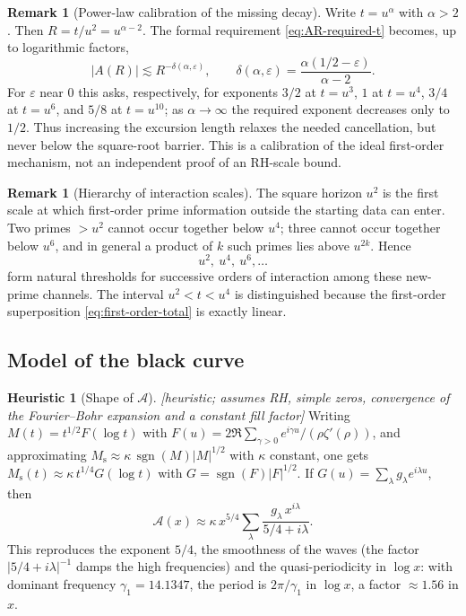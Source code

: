 \documentclass[11pt,reqno]{amsart}
\theoremstyle{plain}
\theoremstyle{definition}
\newtheorem{remark}[theorem]{Remark}
\newtheorem{heuristic}[theorem]{Heuristic}
\DeclareMathOperator{\sgn}{sgn}
\newcommand{\Ms}{M_{\mathrm{s}}}
\newcommand{\Anet}{\mathcal{A}}
\newcommand{\eps}{\varepsilon}
\begin{document}
\begin{remark}[Power-law calibration of the missing decay]
\label{rem:power-calibration-copy}
Write $t=u^\alpha$ with $\alpha>2$.  Then
$R=t/u^2=u^{\alpha-2}$.  The formal requirement
\eqref{eq:AR-required-t} becomes, up to logarithmic factors,
\begin{equation}
\label{eq:AR-required-R}
  |A(R)|\lesssim R^{-\delta(\alpha,\eps)},
  \qquad
  \delta(\alpha,\eps)
  =\frac{\alpha(1/2-\eps)}{\alpha-2}.
\end{equation}
For $\eps$ near $0$ this asks, respectively, for exponents $3/2$ at
$t=u^3$, $1$ at $t=u^4$, $3/4$ at $t=u^6$, and $5/8$ at $t=u^{10}$;
as $\alpha\to\infty$ the required exponent decreases only to $1/2$.
Thus increasing the excursion length relaxes the needed cancellation, but
never below the square-root barrier.  This is a calibration of the ideal
first-order mechanism, not an independent proof of an RH-scale bound.
\end{remark}

\begin{remark}[Hierarchy of interaction scales]
\label{rem:new-prime-hierarchy}
The square horizon $u^2$ is the first scale at which first-order prime
information outside the starting data can enter.  Two primes $>u^2$ cannot
occur together below $u^4$; three cannot occur together below $u^6$, and in
general a product of $k$ such primes lies above $u^{2k}$.  Hence
\[
  u^2,\ u^4,\ u^6,\ldots
\]
form natural thresholds for successive orders of interaction among these
new-prime channels.  The interval $u^2<t<u^4$ is distinguished because the
first-order superposition \eqref{eq:first-order-total} is exactly linear.
\end{remark}


\subsection{Model of the black curve}
\label{subsec:model}

\begin{heuristic}[Shape of $\Anet$]
\label{heu:model}
\emph{[heuristic; assumes RH, simple zeros, convergence of the
Fourier--Bohr expansion and a constant fill factor]} Writing
$M(t)=t^{1/2}F(\log t)$ with
$F(u)=2\Re\sum_{\gamma>0}e^{i\gamma u}/(\rho\zeta'(\rho))$, and
approximating $\Ms\approx\kappa\,\sgn(M)|M|^{1/2}$ with $\kappa$ constant,
one gets $\Ms(t)\approx\kappa\,t^{1/4}G(\log t)$ with
$G=\sgn(F)|F|^{1/2}$. If $G(u)=\sum_\lambda g_\lambda e^{i\lambda u}$, then
\[
  \Anet(x)\approx\kappa\,x^{5/4}\sum_\lambda \frac{g_\lambda\,x^{i\lambda}}{5/4+i\lambda}.
\]
This reproduces the exponent $5/4$, the smoothness of the waves (the factor
$|5/4+i\lambda|^{-1}$ damps the high frequencies) and the quasi-periodicity
in $\log x$: with dominant frequency $\gamma_1=14.1347$, the period is
$2\pi/\gamma_1$ in $\log x$, a factor $\approx1.56$ in $x$.
\end{heuristic}
\end{document}
